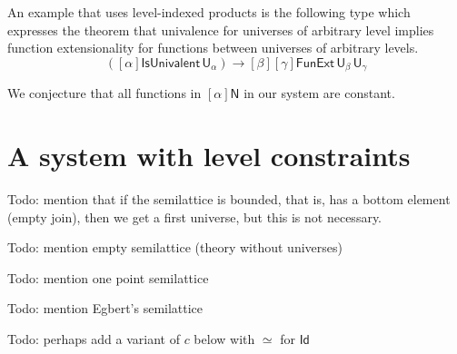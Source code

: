 \documentclass[11pt,a4paper]{article}
\theoremstyle{definition}
\newcommand{\Id}{\mathsf{Id}}
\newcommand{\NN}{\mathsf{N}}
\newcommand{\UU}{\mathsf{U}}
\begin{document}
An example that uses level-indexed products is the following type which
expresses the theorem that univalence for universes of arbitrary level implies
function extensionality for functions between universes of arbitrary levels.
$$
([\alpha]\mathsf{IsUnivalent}\, \UU_\alpha)
\to [\beta][\gamma] \mathsf{FunExt}\, \UU_\beta\, \UU_\gamma
$$

We conjecture that all functions in $[\alpha]\NN$ in our system
are constant.



\section{A system with level constraints}\label{sec:constraints}

{\color{red} Todo: mention that if the semilattice is bounded, that is, has a bottom element (empty join), then we get a first universe, but this is not necessary.}

{\color{red} Todo: mention empty semilattice (theory without universes)}

{\color{red} Todo: mention one point semilattice}

{\color{red} Todo: mention Egbert's semilattice}

{\color{red} Todo: perhaps add a variant of $c$ below with $\simeq$ for $\Id$}
\end{document}
